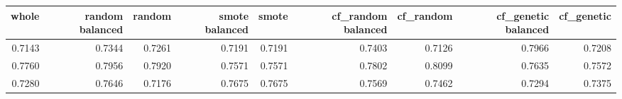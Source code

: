 \begin{tabular}{rrrrrrrrr}
\toprule

 whole &  random balanced &  random &  smote balanced &  smote &  cf\_random balanced &  cf\_random &  cf\_genetic balanced &  cf\_genetic \\
\midrule

0.7143 &           0.7344 &  0.7261 &          0.7191 & 0.7191 &              0.7403 &     0.7126 &               0.7966 &      0.7208 \\
0.7760 &           0.7956 &  0.7920 &          0.7571 & 0.7571 &              0.7802 &     0.8099 &               0.7635 &      0.7572 \\
0.7280 &           0.7646 &  0.7176 &          0.7675 & 0.7675 &              0.7569 &     0.7462 &               0.7294 &      0.7375 \\

\bottomrule
\end{tabular}
